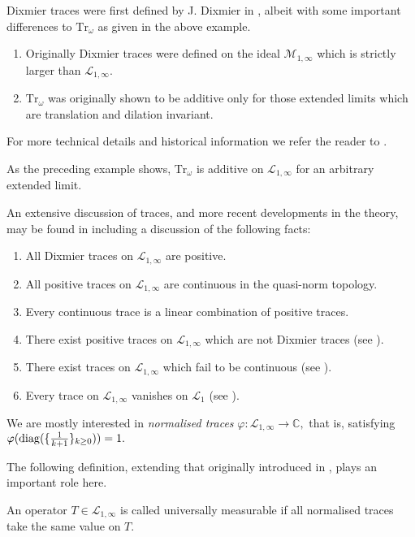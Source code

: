     \begin{rem}
        Dixmier traces were first defined by J. Dixmier in \cite{Dixmier}, albeit with some important differences to $\mathrm{Tr}_\omega$ as given in the above example.
        \begin{enumerate}[{\rm (i)}]
            \item Originally Dixmier traces were defined on the ideal $\mathcal{M}_{1,\infty}$ which is strictly larger than $\mathcal{L}_{1,\infty}.$
            \item $\mathrm{Tr}_\omega$ was originally shown to be additive only for those extended limits which are translation and dilation invariant.
        \end{enumerate}
        For more technical details and historical information we refer the reader to \cite[Chapter 6]{LSZ}.
                
        As the preceding example shows, $\mathrm{Tr}_\omega$ is additive on $\mathcal{L}_{1,\infty}$ for an arbitrary extended limit.
    \end{rem}    

    An extensive discussion of traces, and more recent developments in the theory, may be found in \cite{LSZ} including a discussion of the following facts:
    \begin{enumerate}
        \item All Dixmier traces on $\mathcal{L}_{1,\infty}$ are positive.
        \item All positive traces on $\mathcal{L}_{1,\infty}$ are continuous in the quasi-norm topology.
        \item Every continuous trace is a linear combination of positive traces.
        \item There exist positive traces on $\mathcal{L}_{1,\infty}$ which are not Dixmier traces (see \cite{SSUZ-pietsch}).
        \item There exist traces on $\mathcal{L}_{1,\infty}$ which fail to be continuous (see \cite{DFWW}).
        \item Every trace on $\mathcal{L}_{1,\infty}$ vanishes on $\mathcal{L}_1$ (see \cite{DFWW}).
    \end{enumerate}

    We are mostly interested in {\it normalised traces} $\varphi:\mathcal{L}_{1,\infty}\to\mathbb{C},$ that is, satisfying $\varphi({\rm diag}(\{\frac1{k+1}\}_{k\geq0}))=1.$

    The following definition, extending that originally introduced in \cite[Definition 2.$\beta$.7]{NCG-book}, plays an important role here.
    \begin{defi}\label{def:uni-meas}
        An operator $T\in\mathcal{L}_{1,\infty}$ is called universally measurable if all normalised traces take the same value on $T.$
    \end{defi}
    
